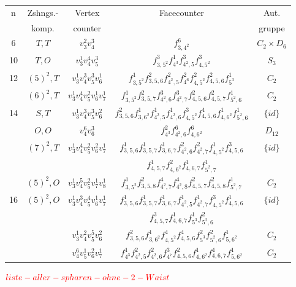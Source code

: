 \documentclass[12pt,titlepage,twoside,cleardoublepage]{article}
\theoremstyle{nummermitklammern}
\numberwithin{equation}{section}
\begin{document}
\begin{tabular}[h]{|c|c|c|c|c|}
\hline
n &Zshngs.-& Vertex & Facecounter & Aut.\\
&komp.&counter&& gruppe\\
 \hline
 6& $T,T$ & $v_3^2v_4^3$&$f^6_{3,4^2}$& $C_2\times D_6$\\
 \hline
10& $T,O$ & $v_3^1v_4^4v_5^3$& $f^3_{3,5^2}f^1_{4^3}f^3_{4^2,5}f^3_{4,5^2}$ &$S_3$\\
 \hline
12& $(5)^2,T$ &$v_3^1v_4^3v_5^3v_6^1$& $f^1_{3,5^2}f^2_{3,5,6}f^2_{4^2,5}f^2_{4^6}f^2_{4,5^2}f^2_{4,5,6}f^1_{5^3}$&$C_2$\\
 \hline
  & $(6)^2,T $& $ v_3^1v_4^4v_5^2v_6^1v_7^1$& $f^1_{3,5^2}f^2_{3,5,7}f^3_{4^2,6}f^3_{4^2,7}f^2_{4,5,6}f^2_{4,5,7}f^1_{5^2,6}$ &$C_2$\\
14& $S,T$& $ v_3^1v_4^3v_5^3v_6^2$& $f^2_{3,5,6}f^1_{3,6^2}f^1_{4^2,5}f^1_{4^2,6}f^3_{4,5^2}f^4_{4,5,6}f^1_{4,6^2}f^1_{5^2,6}$ &$\{id\}$\\
  & $O,O$ & $v_4^6v_6^3$& $f^2_{4^3}f^6_{4^2,6}f^6_{4,6^2} $ & $D_{12}$\\
 \hline
  &$(7)^2,T$ &$v_3^1v_4^4v_5^2v_6^2v_7^1$&$f^1_{3,5,6}f^1_{3,5,7}f^1_{3,6,7}f^2_{4^2,6}f^2_{4^2,7}f^1_{4,5^2}f^3_{4,5,6}$ &$\{id\}$ \\
  &&&$f^1_{4,5,7}f^2_{4,6^2}f^1_{4,6,7}f^1_{5^2,7}$&\\
  & $(5)^2,O$& $v_3^1v_4^5v_5^2v_7^1v_8^1$&$f^1_{3,5^2}f^2_{3,5,8}f^4_{4^2,7}f^4_{4^2,8}f^2_{4,5,7}f^2_{4,5,8}f^1_{5^2,7}$ &$C_2$\\
16& $(5)^2,O$&$ v_3^1v_4^3v_5^4v_6^1v_7^1$&$f^1_{3,5,6}f^1_{3,5,7}f^1_{3,6,7}f^1_{4^2,5}f^1_{4^2,7}f^3_{4,5^2}f^1_{4,5,6}$ &$\{id\}$\\
&&&$f^3_{4,5,7}f^1_{4,6,7}f^1_{5^3}f^2_{5^2,6}$&\\
  &          & $v_3^1v_4^2v_5^5v_6^2$& $f^2_{3,5,6}f^1_{3,6^2}f^4_{4,5^2}f^4_{4,5,6}f^2_{5^3}f^2_{5^2,6}f^1_{5,6^2}$ &$C_2$\\
  &          &$v_4^6v_5^1v_6^2v_7^1$ &$f^1_{4^3}f^2_{4^2,5}f^2_{4^2,6}f^3_{4^7}f^2_{4,5,6}f^1_{4,6^2}f^4_{4,6,7}f^1_{5,6^2}$ &$C_2$\\
 \hline
\end{tabular}


$\textcolor{red}{liste-aller-spharen-ohne-2-Waist}$
\end{document}
